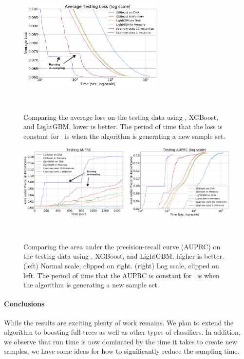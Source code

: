 \begin{figure}[t]
    \centering
    \includegraphics[width=0.65\textwidth]{splice-loss.png}
    \caption{Comparing the average loss on the testing data using \Sparrow, XGBoost, and LightGBM, lower is better.
        The period of time that the loss is constant for \Sparrow\ is when the algorithm is generating a new sample set.}~\label{fig:loss}
\end{figure}



\begin{figure}[t]
    \centering
    \includegraphics[width=\textwidth]{splice-auprc.png}
    \caption{Comparing the area under the precision-recall curve (AUPRC) on the testing data
    using \Sparrow, XGBoost, and LightGBM, higher is better.
    (left) Normal scale, clipped on right.
    (right) Log scale, clipped on left.
    The period of time that the AUPRC is constant for \Sparrow\ is when the algorithm is generating a new sample set.}~\label{fig:auprc}
\end{figure}


\paragraph{Conclusions}
While the results are exciting plenty of work remains. We plan to
extend the algorithm to boosting full trees as well as other types of
classifiers.
In addition, we observe that run time is now dominated by the time it
takes to create new samples, we have some ideas for how to
significantly reduce the sampling time.





